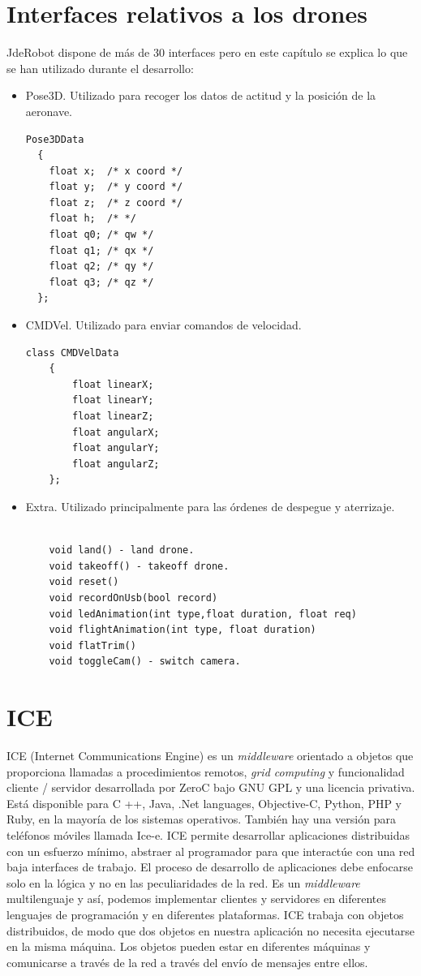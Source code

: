 \section{Interfaces relativos a los drones}
JdeRobot dispone de más de 30 interfaces pero en este cap\'itulo se explica lo que se han utilizado durante el desarrollo:
\begin{itemize}
\item Pose3D. Utilizado para recoger los datos de actitud y la posici\'on de la aeronave.
\begin{lstlisting}[frame=single]
Pose3DData
  {
	float x;  /* x coord */
	float y;  /* y coord */
	float z;  /* z coord */
  	float h;  /* */
	float q0; /* qw */
	float q1; /* qx */
	float q2; /* qy */
	float q3; /* qz */
  };
\end{lstlisting}

\item CMDVel. Utilizado para enviar comandos de velocidad.
\begin{lstlisting}[frame=single]
	class CMDVelData
	{
		float linearX;
		float linearY;
		float linearZ;
		float angularX;
		float angularY;
		float angularZ;										
	};

\end{lstlisting}
\item Extra. Utilizado principalmente para las órdenes de despegue y aterrizaje.
\begin{lstlisting}[frame=single]

    void land() - land drone. 
    void takeoff() - takeoff drone. 
    void reset() 
    void recordOnUsb(bool record) 
    void ledAnimation(int type,float duration, float req) 
    void flightAnimation(int type, float duration) 
    void flatTrim() 
    void toggleCam() - switch camera. 
\end{lstlisting}

\end{itemize}

\section{ICE}
\label{sec:ICE}
ICE\cite{ice} (Internet Communications Engine) es un \textit{middleware}  orientado a objetos que proporciona llamadas a procedimientos remotos, \textit{grid computing} y funcionalidad cliente / servidor desarrollada por ZeroC bajo GNU GPL y una licencia privativa. Está disponible para C ++,
Java, .Net languages, Objective-C, Python, PHP y Ruby, en la mayoría de los sistemas operativos. También hay una versión para teléfonos móviles llamada Ice-e. ICE permite desarrollar aplicaciones distribuidas con un esfuerzo mínimo, abstraer al programador para que interactúe con una red baja interfaces de trabajo. El proceso de desarrollo de aplicaciones debe enfocarse solo en la lógica y no en las peculiaridades de la red. Es un \textit{middleware} multilenguaje y así, podemos implementar clientes y servidores en diferentes lenguajes de programación y en diferentes plataformas. ICE trabaja con objetos distribuidos, de modo que dos objetos en nuestra aplicación no necesita ejecutarse en la misma máquina. Los objetos pueden estar en diferentes máquinas y comunicarse a través de la red a través del envío de mensajes entre ellos.

